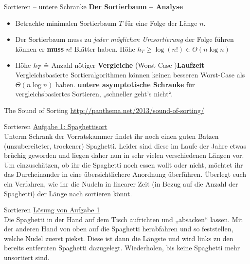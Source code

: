 \begin{frame}{Sortieren – untere Schranke}
	\textbf{Der Sortierbaum -- Analyse}
	\pause
	\begin{itemize}
		\item Betrachte minimalen Sortierbaum $T$ für eine Folge der Länge $n$.
		\pause
		\item Der Sortierbaum muss zu \textit{jeder möglichen Umsortierung} der Folge führen können \impl er \textbf{muss} $n!$ Blätter haben.
		\pause
		\implitem Höhe $h_T \geq \log(n!) \in \Theta(n \log n)$ 
		\pause
		\item Höhe $h_T \mathrel{\hat{=}}$ Anzahl nötiger \textbf{Vergleiche} \entspr (Worst-Case-)\textbf{Laufzeit}
		\Implitem Vergleichsbasierte Sortieralgorithmen können keinen besseren Worst-Case als $\Theta(n\log n)$ haben.
		\pause
		\implitem \textbf{untere asymptotische Schranke} für vergleichsbasiertes Sortieren, „schneller geht's nicht“. \quad\qedsymbol
	\end{itemize}
\end{frame}

\begin{frame}{The Sound of Sorting}
	\url{http://panthema.net/2013/sound-of-sorting/}
\end{frame}


\begin{frame}{Sortieren}
	\underline{Aufgabe 1: Spaghettisort} \\
	Unterm Schrank der Vorratskammer findet ihr noch einen guten Batzen (unzubereiteter, trockener) Spaghetti. Leider sind diese im Laufe der Jahre etwas brüchig geworden und liegen daher nun in sehr vielen verschiedenen Längen vor. Um einzuschätzen, ob ihr die Spaghetti noch essen wollt oder nicht, möchtet ihr das Durcheinander in eine übersichtlichere Anordnung überführen. Überlegt euch ein Verfahren, wie ihr die Nudeln in linearer Zeit (in Bezug auf die Anzahl der Spaghetti) der Länge nach sortieren könnt.
\end{frame}

\begin{frame}{Sortieren}
	\underline{Lösung von Aufgabe 1} \\
	Die Spaghetti in der Hand auf dem Tisch aufrichten und „absacken“ lassen. Mit der anderen Hand von oben auf die Spaghetti herabfahren und so feststellen, welche Nudel zuerst piekst. Diese ist dann die Längste und wird links zu den bereits entfernten Spaghetti dazugelegt. Wiederholen, bis keine Spaghetti mehr unsortiert sind.
\end{frame}


